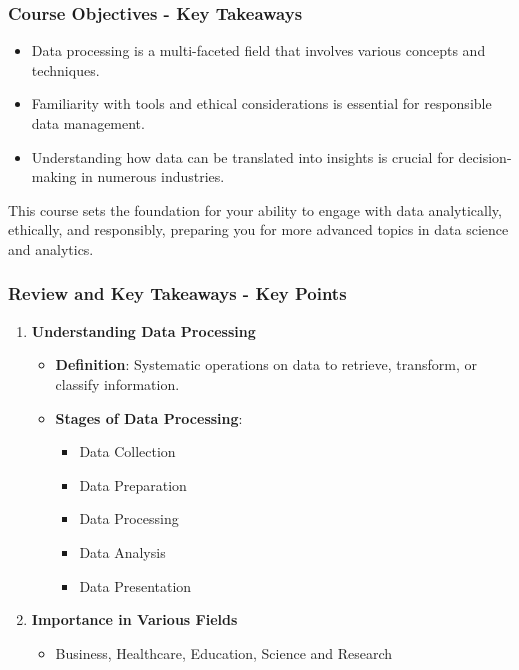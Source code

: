 \documentclass[aspectratio=169]{beamer}
\begin{document}
\begin{frame}[fragile]
    \frametitle{Course Objectives - Key Takeaways}
    \begin{itemize}
        \item Data processing is a multi-faceted field that involves various concepts and techniques.
        \item Familiarity with tools and ethical considerations is essential for responsible data management.
        \item Understanding how data can be translated into insights is crucial for decision-making in numerous industries.
    \end{itemize}
    This course sets the foundation for your ability to engage with data analytically, ethically, and responsibly, preparing you for more advanced topics in data science and analytics.
\end{frame}

\begin{frame}[fragile]
    \frametitle{Review and Key Takeaways - Key Points}
    \begin{enumerate}
        \item \textbf{Understanding Data Processing}
            \begin{itemize}
                \item \textbf{Definition}: Systematic operations on data to retrieve, transform, or classify information.
                \item \textbf{Stages of Data Processing}:
                \begin{itemize}
                    \item Data Collection
                    \item Data Preparation
                    \item Data Processing
                    \item Data Analysis
                    \item Data Presentation
                \end{itemize}
            \end{itemize}

        \item \textbf{Importance in Various Fields}
            \begin{itemize}
                \item Business, Healthcare, Education, Science and Research
            \end{itemize}
    \end{enumerate}
\end{frame}
\end{document}
